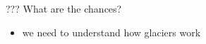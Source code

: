 \documentclass[hide notes,intlimits]{beamer}
\begin{document}
\begin{frame}[plain]
\end{frame}

  {
} 

\begin{frame}[plain]
\end{frame}

  
{
} 

\begin{frame}{??? What are the chances?}
\begin{itemize}
\item we need to understand how glaciers work
\end{itemize}
\end{frame}
\end{document}
